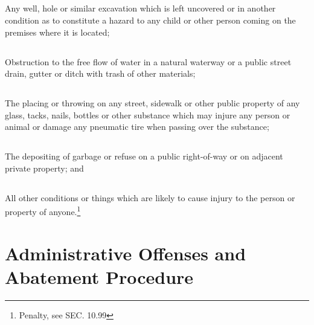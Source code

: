\subsection{}
 Any well, hole or similar excavation which is left uncovered or in another condition as to constitute a hazard to any child or other person coming on the premises where it is located;
\subsection{}
 Obstruction to the free flow of water in a natural waterway or a public street drain, gutter or ditch with trash of other materials;
\subsection{}
 The placing or throwing on any street, sidewalk or other public property of any glass, tacks, nails, bottles or other substance which may injure any person or animal or damage any pneumatic tire when passing over the substance;
\subsection{}
 The depositing of garbage or refuse on a public right-of-way or on adjacent private property; and
\subsection{}
 All other conditions or things which are likely to cause injury to the person or property of anyone.\footnote{Penalty, see SEC. 10.99}\\

\section{Administrative Offenses and Abatement Procedure}
